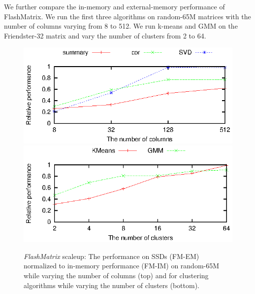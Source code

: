 We further compare the in-memory and external-memory performance of FlashMatrix.
We run the first three algorithms on random-65M matrices
with the number of columns varying from 8 to 512. We run k-means
and GMM on the Friendster-32 matrix and vary the number of clusters from 2 to 64.

\begin{figure}[t]
	\begin{center}
		\footnotesize
		\includegraphics{FlashMatrix_figs/IM-vs-EM-stat.eps}
		\includegraphics{FlashMatrix_figs/IM-vs-EM-clust.eps}
		\caption{{\em FlashMatrix} scaleup: The performance on SSDs  (FM-EM)
      normalized to in-memory performance (FM-IM) on random-65M 
      while varying the number of columns (top) and for
clustering algorithms while varying the number of clusters (bottom).}
		\label{perf:stat}
	\end{center}
  \vspace{-15pt}
\end{figure}

